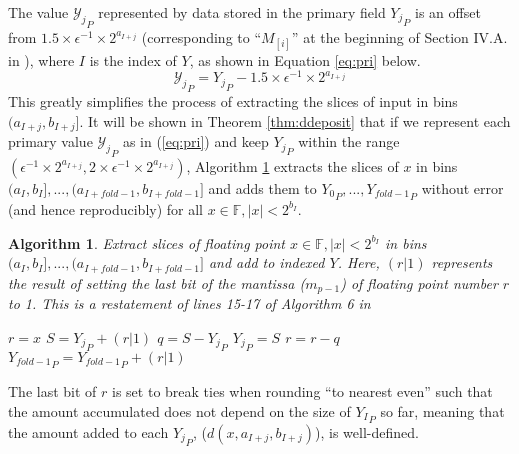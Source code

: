 \documentclass[12pt]{article}
\providecommand{\F}{\ensuremath{\mathbb{F}}}
\providecommand{\To}{\ensuremath{\text{ to }}}
\theoremstyle{plain}
\newtheorem{alg}{Algorithm}[section]
\numberwithin{equation}{section}
\begin{document}
      The value ${\mathcal{Y}_j}_P$ represented by data stored in the primary field ${Y_j}_P$ is an offset from $1.5\times \epsilon^{-1} \times 2^{a_{I + j}}$ (corresponding to ``$M_{[i]}$'' at the beginning of Section IV.A. in \cite{repsum}), where $I$ is the index of $Y$, as shown in Equation \ref{eq:pri} below.
      \begin{equation}
        {\mathcal{Y}_j}_P = {Y_j}_P - 1.5\times\epsilon^{-1}\times2^{a_{I + j}}
        \label{eq:pri}
      \end{equation}
      This greatly simplifies the process of extracting the slices of input in bins $(a_{I + j}, b_{I + j}]$. It will be shown in Theorem \ref{thm:ddeposit} that if we represent each primary value ${\mathcal{Y}_j}_P$ as in (\ref{eq:pri}) and keep ${Y_j}_P$ within the range $(\epsilon^{-1} \times 2^{a_{I + j}}, 2 \times \epsilon^{-1} \times 2^{a_{I + j}})$, Algorithm \ref{alg:deposit} extracts the slices of $x$ in bins $(a_I, b_I], ..., (a_{I + fold - 1}, b_{I + fold - 1}]$ and adds them to ${Y_0}_P, ..., {Y_{fold - 1}}_P$ without error (and hence reproducibly) for all $x \in \F, |x| < 2^{b_I}$.
      \begin{alg}
        Extract slices of floating point $x \in \F, |x| < 2^{b_I}$ in bins $(a_I, b_I], ..., (a_{I + fold - 1}, b_{I + fold - 1}]$ and add to indexed $Y$. Here, $(r | 1)$ represents the result of setting the last bit of the mantissa ($m_{p - 1}$) of floating point number $r$ to 1. This is a restatement of lines 15-17 of Algorithm 6 in \cite{repsum}
        \begin{algorithmic}[1]
            \State $r = x$ \label{alg:deposit:rgetsx}
            \For{$j = 0 \To (fold - 2)$} \label{alg:deposit:loop}
              \State $S = {Y_j}_P + (r | 1)$ \label{alg:deposit:split}
              \State $q = S - {Y_j}_P$
              \State ${Y_j}_P = S$
              \State $r = r - q$\label{alg:deposit:endsplit}
            \EndFor
            \State ${Y_{fold - 1}}_P = {Y_{fold - 1}}_P + (r | 1)$
          \EndFunction
        \end{algorithmic}
        \label{alg:deposit}
      \end{alg}
      The last bit of $r$ is set to break ties when rounding ``to nearest even'' such that the amount accumulated does not depend on the size of ${Y_I}_P$ so far, meaning that the amount added to each ${Y_j}_P$, ($d(x, a_{I + j}, b_{I + j})$), is well-defined.
\end{document}

